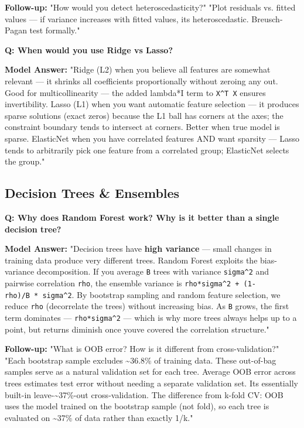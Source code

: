 \documentclass[11pt]{article}
\begin{document}
\textbf{Follow-up:} "How would you detect heteroscedasticity?"
"Plot residuals vs. fitted values --- if variance increases with fitted values, it\textquotesingle s heteroscedastic. Breusch-Pagan test formally."

\textbf{Q: When would you use Ridge vs Lasso?}

\textbf{Model Answer:}
"Ridge (L2) when you believe all features are somewhat relevant --- it shrinks all coefficients proportionally without zeroing any out. Good for multicollinearity --- the added lambda*I term to \texttt{X\^{}T\ X} ensures invertibility.
Lasso (L1) when you want automatic feature selection --- it produces sparse solutions (exact zeros) because the L1 ball has corners at the axes; the constraint boundary tends to intersect at corners. Better when true model is sparse.
ElasticNet when you have correlated features AND want sparsity --- Lasso tends to arbitrarily pick one feature from a correlated group; ElasticNet selects the group."

\subsection{Decision Trees \& Ensembles}\label{decision-trees--ensembles}

\textbf{Q: Why does Random Forest work? Why is it better than a single decision tree?}

\textbf{Model Answer:}
"Decision trees have \textbf{high variance} --- small changes in training data produce very different trees. Random Forest exploits the bias-variance decomposition. If you average \texttt{B} trees with variance \texttt{sigma\^{}2} and pairwise correlation \texttt{rho}, the ensemble variance is \texttt{rho*sigma\^{}2\ +\ (1-rho)/B\ *\ sigma\^{}2}. By bootstrap sampling and random feature selection, we reduce \texttt{rho} (decorrelate the trees) without increasing bias. As \texttt{B} grows, the first term dominates --- \texttt{rho*sigma\^{}2} --- which is why more trees always helps up to a point, but returns diminish once you\textquotesingle ve covered the correlation structure."

\textbf{Follow-up:} "What is OOB error? How is it different from cross-validation?"
"Each bootstrap sample excludes \textasciitilde36.8\% of training data. These out-of-bag samples serve as a natural validation set for each tree. Average OOB error across trees estimates test error without needing a separate validation set. It\textquotesingle s essentially built-in \textquotesingle leave-\textasciitilde37\%-out\textquotesingle{} cross-validation. The difference from k-fold CV: OOB uses the model trained on the bootstrap sample (not fold), so each tree is evaluated on \textasciitilde37\% of data rather than exactly 1/k."
\end{document}
